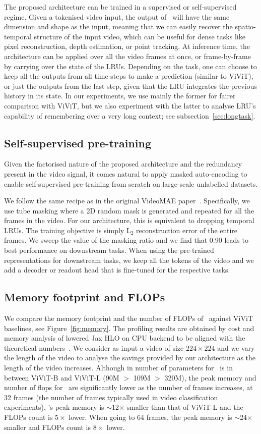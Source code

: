 The proposed architecture can be trained in a supervised or self-supervised regime. Given a tokenised video input, the output of \ssm\ will have the same dimension and shape as the input, meaning that we can easily recover the spatio-temporal structure of the input video, which can be useful for dense tasks like pixel reconstruction, depth estimation, or point tracking. At inference time, the architecture can be applied over all the video frames at once, or frame-by-frame by carrying over the state of the LRUs. Depending on the task, one can choose to keep all the outputs from all time-steps to make a prediction (similar to ViViT), or just the outputs from the last step, given that the LRU integrates the previous history in its state. In our experiments, we use mainly the former for fairer comparison with ViViT, but we also experiment with the latter to analyse LRU's capability of remembering over a very long context; see subsection~\ref{sec:longtask}.   

\subsection{Self-supervised pre-training}

Given the factorised nature of the proposed architecture and the redundancy present in the video signal, it comes natural to apply masked auto-encoding to enable self-supervised pre-training from scratch on large-scale unlabelled datasets. 

We follow the same recipe as in the original VideoMAE paper~\citep{tong2022videomae}. Specifically, we use tube masking where a 2D random mask is generated and repeated for all the frames in the video. For our architecture, this is equivalent to dropping temporal LRUs. The training objective is simply L$_2$ reconstruction error of the entire frames. We sweep the value of the masking ratio and we find that 0.90 leads to best performance on downstream tasks. When using the pre-trained representations for downstream tasks, we keep all the tokens of the video and we add a decoder or readout head that is fine-tuned for the respective tasks.


\subsection{Memory footprint and FLOPs}
We compare the memory footprint and the number of FLOPs of \ssm\ against ViViT baselines, see Figure~\ref{fig:memory}. 
The profiling results are obtained by cost and memory analysis of lowered Jax HLO on CPU backend to be aligned with the theoretical numbers~\cite{jaxstatix}. We consider as input a video of size $224\times224$ and we vary the length of the video to analyse the savings provided by our architecture as the length of the video increases. Although in number of parameters for \ssm\ is in between ViViT-B and ViViT-L (90M $>$ 109M $>$ 320M), the peak memory and number of flops for \ssm\ are significantly lower as the number of frames increases, \eg at 32 frames (the number of frames typically used in video classification experiments), \ssm's peak memory is $\sim$12$\times$ smaller than that of ViViT-L and the FLOPs count is $5\times$ lower. When going to 64 frames, the peak memory is $\sim$24$\times$ smaller and FLOPs count is $8\times$ lower. 